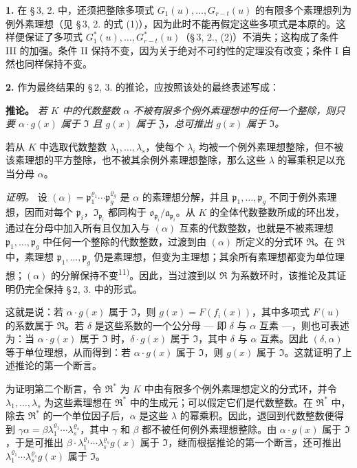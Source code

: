 \documentclass[11pt]{article}
\begin{document}
\medskip\noindent\textbf{1.}
在 \S\,3, 2. 中，还须把整除多项式 $G_1(u),\ldots,G_{r-t}(u)$ 的有限多个素理想列为例外素理想（见 \S\,3, 2. 的式 (1)），因为此时不能再假定这些多项式是本原的。这样便保证了多项式 $G^*_1(u),\ldots,G^*_{r-t}(u)$（\S\,3, 2., (2)）不消失；这构成了条件 III 的加强。条件 II 保持不变，因为关于绝对不可约性的定理没有改变；条件 I 自然也同样保持不变。

\medskip\noindent\textbf{2.}
作为最终结果的 \S\,2, 3. 的推论，应按照该处的最终表述写成：

\noindent\textbf{推论。}
\textit{若 $K$ 中的代数整数 $\alpha$ 不被有限多个例外素理想中的任何一个整除，则只要 $\alpha \cdot g(x)$ 属于 $\mathfrak{I}$ 且 $g(x)$ 属于 $\mathfrak{Z}$，总可推出 $g(x)$ 属于 $\mathfrak{I}$。}

若从 $K$ 中选取代数整数 $\lambda_1,\ldots,\lambda_s$，使每个 $\lambda_i$ 均被一个例外素理想整除，但不被该素理想的平方整除，也不被其余例外素理想整除，那么这些 $\lambda$ 的幂乘积足以充当分母 $\alpha$。

\noindent\textit{证明。}
设 $(\alpha) = \mathfrak{p}_1^{\varrho_1} \cdots \mathfrak{p}_g^{\varrho_g}$ 是 $\alpha$ 的素理想分解，并且 $\mathfrak{p}_1,\ldots,\mathfrak{p}_g$ 不同于例外素理想，因而对每个 $\mathfrak{p}_i$，$\mathfrak{I}_{\mathfrak{p}_i}$ 都同构于 $\mathfrak{o}_{\mathfrak{p}_i}/\mathfrak{a}_{\mathfrak{p}_i}$。从 $K$ 的全体代数整数所成的环出发，通过在分母中加入所有且仅加入与 $(\alpha)$ 互素的代数整数，也就是不被素理想 $\mathfrak{p}_1,\ldots,\mathfrak{p}_g$ 中任何一个整除的代数整数，过渡到由 $(\alpha)$ 所定义的分式环 $\mathfrak{R}$。在 $\mathfrak{R}$ 中，素理想 $\mathfrak{p}_1,\ldots,\mathfrak{p}_g$ 仍是素理想，但变为主理想；其余所有素理想都变为单位理想；$(\alpha)$ 的分解保持不变\textsuperscript{11)}。因此，当过渡到以 $\mathfrak{R}$ 为系数环时，该推论及其证明仍完全保持 \S\,2, 3. 中的形式。

这就是说：若 $\alpha \cdot g(x)$ 属于 $\mathfrak{I}$，则 $g(x) = F(f_i(x))$，其中多项式 $F(u)$ 的系数属于 $\mathfrak{R}$。若 $\delta$ 是这些系数的一个公分母 --- 即 $\delta$ 与 $\alpha$ 互素 ---，则也可表述为：当 $\alpha \cdot g(x)$ 属于 $\mathfrak{I}$ 时，$\delta \cdot g(x)$ 属于 $\mathfrak{I}$，其中 $\delta$ 与 $\alpha$ 互素。因此 $(\delta, \alpha)$ 等于单位理想，从而得到：若 $\alpha \cdot g(x)$ 属于 $\mathfrak{I}$，则 $g(x)$ 属于 $\mathfrak{I}$。这就证明了上述推论的第一个断言。

为证明第二个断言，令 $\mathfrak{R}^*$ 为 $K$ 中由有限多个例外素理想定义的分式环，并令 $\lambda_1,\ldots,\lambda_s$ 为这些素理想在 $\mathfrak{R}^*$ 中的生成元；可以假定它们是代数整数。在 $\mathfrak{R}^*$ 中，除去 $\mathfrak{R}^*$ 的一个单位因子后，$\alpha$ 是这些 $\lambda$ 的幂乘积。因此，退回到代数整数便得到 $\gamma\alpha = \beta \lambda_1^{\varrho_1} \cdots \lambda_s^{\varrho_s}$，其中 $\gamma$ 和 $\beta$ 都不被任何例外素理想整除。由 $\alpha \cdot g(x)$ 属于 $\mathfrak{I}$，于是可推出 $\beta \cdot \lambda_1^{\varrho_1} \cdots \lambda_s^{\varrho_s} g(x)$ 属于 $\mathfrak{I}$，继而根据推论的第一个断言，还可推出 $\lambda_1^{\varrho_1} \cdots \lambda_s^{\varrho_s} g(x)$ 属于 $\mathfrak{I}$。
\end{document}
